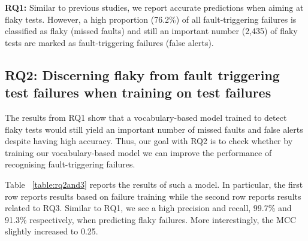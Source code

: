 

\begin{tcolorbox}[
    left=2pt,right=2pt,top=2pt,bottom=2pt, %
    arc=0pt, %
    boxrule=1.2pt %
]
\textbf{RQ1:} Similar to previous studies, we report accurate predictions when aiming at flaky tests. However, a high proportion (76.2\%) of all fault-triggering failures is classified as flaky (missed faults) and still an important number (2,435) of flaky tests are marked as fault-triggering failures (false alerts).
\end{tcolorbox}


\subsection{RQ2: Discerning flaky from fault triggering test failures when training on test failures}

The results from RQ1 show that a vocabulary-based model trained to detect flaky tests would still yield an important number of missed faults and false alerts despite having high accuracy. Thus, our goal with RQ2 is to check whether by training our vocabulary-based model we can improve the performance of recognising fault-triggering failures. 

Table ~\ref{table:rq2and3} reports the results of such a model. In particular, the first row reports results based on failure training while the second row reports results related to RQ3. Similar to RQ1, we see a high precision and recall, 99.7\% and 91.3\% respectively, when predicting flaky failures. More interestingly, the MCC slightly increased to 0.25. 




